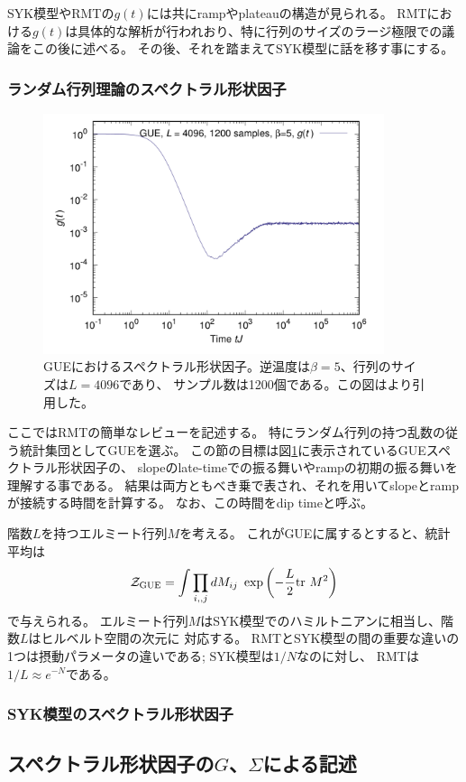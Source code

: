 SYK模型やRMTの$g(t)$には共にrampやplateauの構造が見られる。
RMTにおける$g(t)$は具体的な解析が行われおり、特に行列のサイズのラージ極限での議論をこの後に述べる。
その後、それを踏まえてSYK模型に話を移す事にする。

\subsubsection{ランダム行列理論のスペクトラル形状因子}
\begin{figure}[ht]
	\centering
	\includegraphics[width=10cm]{figures/spectralformfactor_inRMT}
	\caption{GUEにおけるスペクトラル形状因子。逆温度は$\beta=5$、行列のサイズは$L=4096$であり、
		サンプル数は1200個である。この図は\cite{polchinski_chaos}より引用した。
	}
	\label{fig:spectralformfactor_inRMT}
\end{figure}
ここではRMTの簡単なレビューを記述する。
特にランダム行列の持つ乱数の従う統計集団としてGUEを選ぶ。
この節の目標は図\ref{fig:spectralformfactor_inRMT}に表示されているGUEスペクトラル形状因子の、
slopeのlate-timeでの振る舞いやrampの初期の振る舞いを理解する事である。
結果は両方ともべき乗で表され、それを用いてslopeとrampが接続する時間を計算する。
なお、この時間をdip timeと呼ぶ。

階数$L$を持つエルミート行列$M$を考える。
これがGUEに属するとすると、統計平均は
\begin{align}
	\mathcal{Z}_{\mathrm{GUE}} = \int \prod_{i, ,j} dM_{ij}\ \exp\left(
		-\frac{L}{2}\mathrm{tr}\ M^2
	\right)
\end{align}
で与えられる。
エルミート行列$M$はSYK模型でのハミルトニアンに相当し、階数$L$はヒルベルト空間の次元に
対応する。
RMTとSYK模型の間の重要な違いの1つは摂動パラメータの違いである; SYK模型は$1/N$なのに対し、
RMTは$1/L \approx e^{-N}$である。

\subsubsection{SYK模型のスペクトラル形状因子}

\subsection{スペクトラル形状因子の$G$、$\Sigma$による記述}

\pagebreak